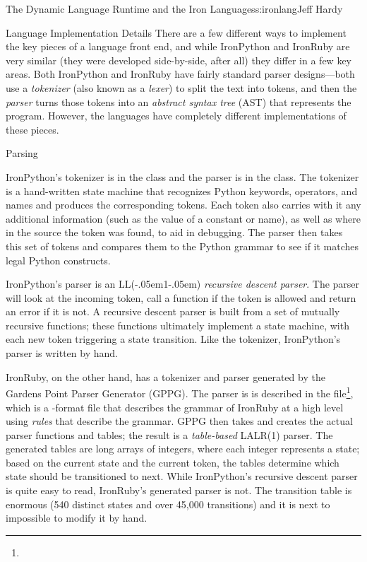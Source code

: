 \begin{aosachapter}{The Dynamic Language Runtime and the Iron Languages}{s:ironlang}{Jeff Hardy}
\begin{aosasect1}{Language Implementation Details}
There are a few different ways to implement the key pieces of a language
front end, and while IronPython and IronRuby are very similar (they were
developed side-by-side, after all) they differ in a few key areas. Both
IronPython and IronRuby have fairly standard parser designs---both use a
\emph{tokenizer} (also known as a \emph{lexer}) to split the text into tokens,
and then the \emph{parser} turns those tokens into an \emph{abstract syntax
tree} (AST) that represents the program. However, the languages have completely
different implementations of these pieces.

\end{aosasect1}

\begin{aosasect1}{Parsing}

IronPython's tokenizer is in the  class and
the parser is in the  class. The tokenizer is
a hand-written state machine that recognizes Python keywords, operators, and
names and produces the corresponding tokens. Each token also carries with it
any additional information (such as the value of a constant or name), as well
as where in the source the token was found, to aid in debugging. The parser then
takes this set of tokens and compares them to the Python grammar to see if it
matches legal Python constructs.

IronPython's parser is an LL(\kern-.05em1\kern-.05em) \emph{recursive descent parser}. The parser
will look at the incoming token, call a function if the token is allowed and
return an error if it is not. A recursive descent parser is built from a set of
mutually recursive functions; these functions ultimately implement a state
machine, with each new token triggering a state transition. Like the tokenizer,
IronPython's parser is written by hand.

IronRuby, on the other hand, has a tokenizer and parser generated by the
Gardens Point Parser Generator (GPPG). The parser is is described in the
file\footnote{}, which is a
-format file that describes the grammar of IronRuby at a high level
using \emph{rules} that describe the grammar. GPPG then takes 
and creates the actual parser functions and tables; the result is a
\emph{table-based} LALR(1) parser. The generated tables are long arrays of
integers, where each integer represents a state; based on the current state and
the current token, the tables determine which state should be transitioned to
next. While IronPython's recursive descent parser is quite easy to read,
IronRuby's generated parser is not. The transition table is enormous (540
distinct states and over 45,000 transitions) and it is next to impossible to
modify it by hand.


\end{aosasect1}
\end{aosachapter}
